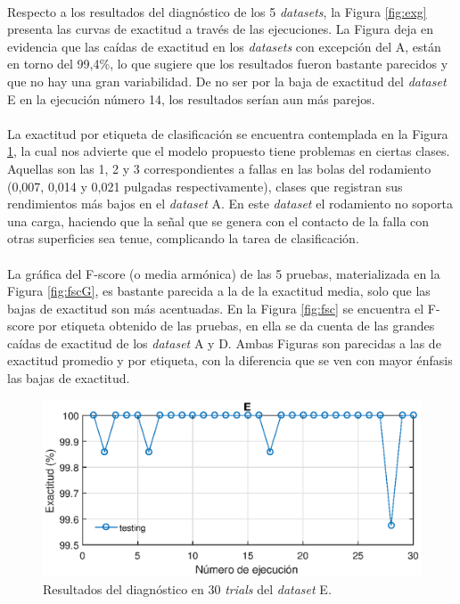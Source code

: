 \documentclass[12pt]{article}
\begin{document}
\paragraph{}
Respecto a los resultados del diagnóstico de los 5 \textit{datasets}, la Figura \ref{fig:exg} presenta las curvas de exactitud a través de las ejecuciones. La Figura deja en evidencia que las caídas de exactitud en los \textit{datasets} con excepción del A, están en torno del 99,4\%, lo que sugiere que los resultados fueron bastante parecidos y que no hay una gran variabilidad. De no ser por la baja de exactitud del \textit{dataset} E en la ejecución número 14, los resultados serían aun más parejos.

\paragraph{}
La exactitud por etiqueta de clasificación se encuentra contemplada en la Figura \ref{fig:accge}, la cual nos advierte que el modelo propuesto tiene problemas en ciertas clases. Aquellas son las 1, 2 y 3 correspondientes a fallas en las bolas del rodamiento (0,007, 0,014 y 0,021 pulgadas respectivamente), clases que registran sus rendimientos más bajos en el \textit{dataset} A. En este \textit{dataset} el rodamiento no soporta una carga, haciendo que la señal que se genera con el contacto de la falla con otras superficies sea tenue, complicando la tarea de clasificación.

\paragraph{}
La gráfica del F-score (o media armónica) de las 5 pruebas, materializada en la Figura \ref{fig:fscG}, es bastante parecida a la de la exactitud media, solo que las bajas de exactitud son más acentuadas. En la Figura \ref{fig:fsc} se encuentra el F-score por etiqueta obtenido de las pruebas, en ella se da cuenta de las grandes caídas de exactitud de los \textit{dataset} A y D. Ambas Figuras son parecidas a las de exactitud promedio y por etiqueta, con la diferencia que se ven con mayor énfasis las bajas de exactitud. 


\begin{figure}[ht]
  \centering
    \includegraphics[scale=0.9]{./AccGE.eps}
  \caption{Resultados del diagnóstico en 30 \textit{trials} del \textit{dataset} E.}
  \label{fig:accge}
\end{figure}
\end{document}
